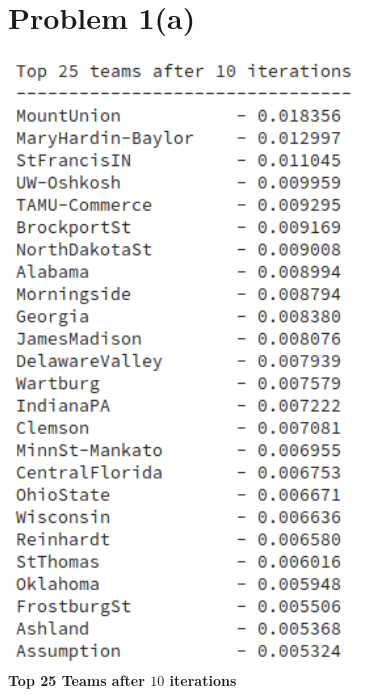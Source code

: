 \documentclass[openany,11pt]{homework}
\begin{document}
\maketitle

\section*{Problem 1(a)}

\begin{center}
	\centering
	\includegraphics[width = 0.70\textwidth]{1b-10.png}
	\\
	\textbf{Top 25 Teams after $10$ iterations}
\end{center}
\end{document}
